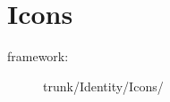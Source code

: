 
\section{Icons}
\hypertarget{sec:Concepts:Identity:Icons}{}
\label{sec:Concepts:Identity:Icons}

\begin{description}
\item[framework:] trunk/Identity/Icons/
\end{description}

